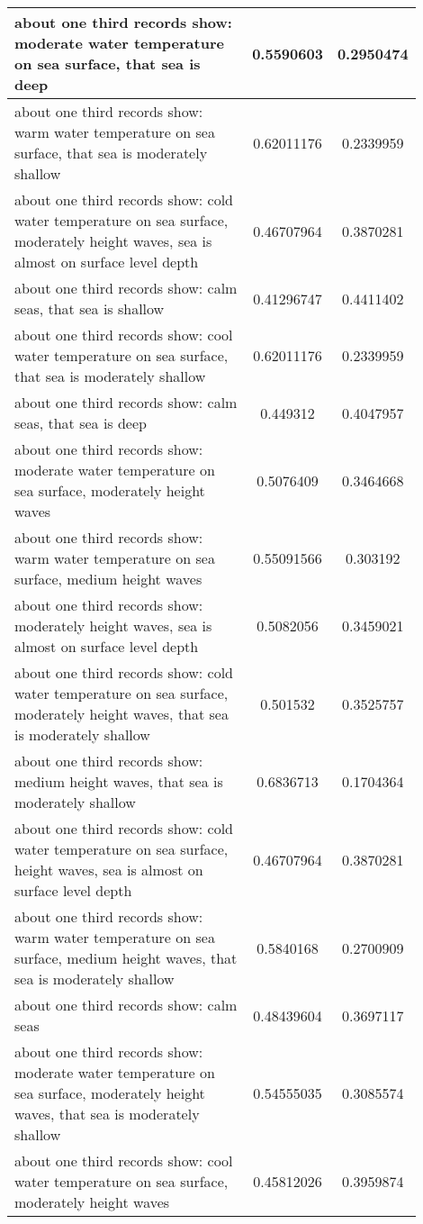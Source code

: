 \documentclass{article}
\begin{document}
\begin{longtable}{|p{0.9\linewidth}|c|c|}
about one third records show: moderate water temperature on sea surface, that sea is deep & 0.5590603 & 0.2950474 \\ \hline
about one third records show: warm water temperature on sea surface, that sea is moderately shallow & 0.62011176 & 0.2339959 \\ \hline
about one third records show: cold water temperature on sea surface, moderately height waves, sea is almost on surface level depth & 0.46707964 & 0.3870281 \\ \hline
about one third records show: calm seas, that sea is shallow & 0.41296747 & 0.4411402 \\ \hline
about one third records show: cool water temperature on sea surface, that sea is moderately shallow & 0.62011176 & 0.2339959 \\ \hline
about one third records show: calm seas, that sea is deep & 0.449312 & 0.4047957 \\ \hline
about one third records show: moderate water temperature on sea surface, moderately height waves & 0.5076409 & 0.3464668 \\ \hline
about one third records show: warm water temperature on sea surface, medium height waves & 0.55091566 & 0.303192 \\ \hline
about one third records show: moderately height waves, sea is almost on surface level depth & 0.5082056 & 0.3459021 \\ \hline
about one third records show: cold water temperature on sea surface, moderately height waves, that sea is moderately shallow & 0.501532 & 0.3525757 \\ \hline
about one third records show: medium height waves, that sea is moderately shallow & 0.6836713 & 0.1704364 \\ \hline
about one third records show: cold water temperature on sea surface, height waves, sea is almost on surface level depth & 0.46707964 & 0.3870281 \\ \hline
about one third records show: warm water temperature on sea surface, medium height waves, that sea is moderately shallow & 0.5840168 & 0.2700909 \\ \hline
about one third records show: calm seas & 0.48439604 & 0.3697117 \\ \hline
about one third records show: moderate water temperature on sea surface, moderately height waves, that sea is moderately shallow & 0.54555035 & 0.3085574 \\ \hline
about one third records show: cool water temperature on sea surface, moderately height waves & 0.45812026 & 0.3959874 \\ \hline

\end{longtable}
\end{document}
